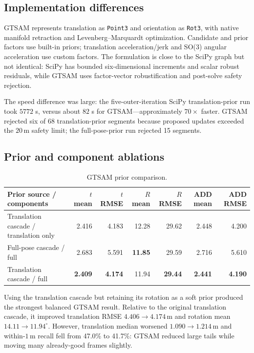 \documentclass[11pt]{article}
\newcommand{\best}[1]{\textbf{#1}}
\newcommand{\unitm}{\,\mathrm{m}}
\newcommand{\unitdeg}{^{\circ}}
\begin{document}
\subsection{Implementation differences}

GTSAM represents translation as \texttt{Point3} and orientation as \texttt{Rot3}, with native manifold retraction and Levenberg--Marquardt optimization.  Candidate and prior factors use built-in priors; translation acceleration/jerk and SO(3) angular acceleration use custom factors.  The formulation is close to the SciPy graph but not identical: SciPy has bounded six-dimensional increments and scalar robust residuals, while GTSAM uses factor-vector robustification and post-solve safety rejection.

The speed difference was large: the five-outer-iteration SciPy translation-prior run took $5772$ s, versus about $82$ s for GTSAM---approximately $70\times$ faster.  GTSAM rejected six of 68 translation-prior segments because proposed updates exceeded the $20\unitm$ safety limit; the full-pose-prior run rejected 15 segments.

\subsection{Prior and component ablations}

\begin{table}[H]
\centering
\caption{GTSAM prior comparison.}
\begin{tabular}{lrrrrrr}
\toprule
Prior source / components & $t$ mean & $t$ RMSE & $R$ mean & $R$ RMSE & ADD mean & ADD RMSE\\
\midrule
Translation cascade / translation only & 2.416 & 4.183 & 12.28 & 29.62 & 2.448 & 4.200\\
Full-pose cascade / full & 2.683 & 5.591 & \best{11.85} & 29.59 & 2.716 & 5.610\\
Translation cascade / full & \best{2.409} & \best{4.174} & 11.94 & \best{29.44} & \best{2.441} & \best{4.190}\\
\bottomrule
\end{tabular}
\end{table}

Using the translation cascade but retaining its rotation as a soft prior produced the strongest balanced GTSAM result.  Relative to the original translation cascade, it improved translation RMSE $4.406\rightarrow4.174\unitm$ and rotation mean $14.11\rightarrow11.94\unitdeg$.  However, translation median worsened $1.090\rightarrow1.214\unitm$ and within-$1\unitm$ recall fell from 47.0\% to 41.7\%: GTSAM reduced large tails while moving many already-good frames slightly.
\end{document}
